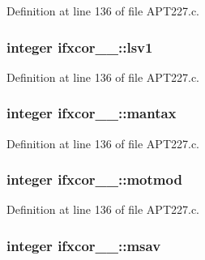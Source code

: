 Definition at line 136 of file A\+P\+T227.\+c.

\subsubsection[{\texorpdfstring{lsv1}{lsv1}}]{\setlength{\rightskip}{0pt plus 5cm}integer ifxcor\+\_\+\_\+\+::lsv1}\hypertarget{structifxcor__1___accc7eefed6d853170e220f513be3fb92}{}\label{structifxcor__1___accc7eefed6d853170e220f513be3fb92}


Definition at line 136 of file A\+P\+T227.\+c.

\subsubsection[{\texorpdfstring{mantax}{mantax}}]{\setlength{\rightskip}{0pt plus 5cm}integer ifxcor\+\_\+\_\+\+::mantax}\hypertarget{structifxcor__1___a8318158b0a73ba6b9b82316ba0fd9146}{}\label{structifxcor__1___a8318158b0a73ba6b9b82316ba0fd9146}


Definition at line 136 of file A\+P\+T227.\+c.

\subsubsection[{\texorpdfstring{motmod}{motmod}}]{\setlength{\rightskip}{0pt plus 5cm}integer ifxcor\+\_\+\_\+\+::motmod}\hypertarget{structifxcor__1___a19a1615f577debc7913ccca4e244a536}{}\label{structifxcor__1___a19a1615f577debc7913ccca4e244a536}


Definition at line 136 of file A\+P\+T227.\+c.

\subsubsection[{\texorpdfstring{msav}{msav}}]{\setlength{\rightskip}{0pt plus 5cm}integer ifxcor\+\_\+\_\+\+::msav}\hypertarget{structifxcor__1___a3e9b4f6eb1024bd1376b17c5b0d96e29}{}\label{structifxcor__1___a3e9b4f6eb1024bd1376b17c5b0d96e29}


